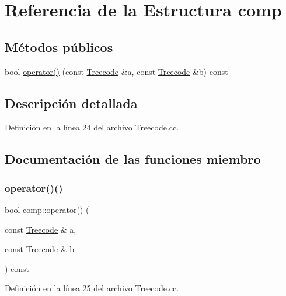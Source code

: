 \hypertarget{structcomp}{}\section{Referencia de la Estructura comp}
\label{structcomp}
\subsection*{Métodos públicos}
\begin{DoxyCompactItemize}
\item 
bool \hyperlink{structcomp_acd68612e049fa4ad770640fcfb1d33cd}{operator()} (const \hyperlink{class_treecode}{Treecode} \&a, const \hyperlink{class_treecode}{Treecode} \&b) const
\end{DoxyCompactItemize}


\subsection{Descripción detallada}


Definición en la línea 24 del archivo Treecode.\+cc.



\subsection{Documentación de las funciones miembro}
\mbox{\label{structcomp_acd68612e049fa4ad770640fcfb1d33cd}} 
\subsubsection{\texorpdfstring{operator()()}{operator()()}}
{\footnotesize\ttfamily bool comp\+::operator() (\begin{DoxyParamCaption}\item[{const \hyperlink{class_treecode}{Treecode} \&}]{a,  }\item[{const \hyperlink{class_treecode}{Treecode} \&}]{b }\end{DoxyParamCaption}) const}



Definición en la línea 25 del archivo Treecode.\+cc.


